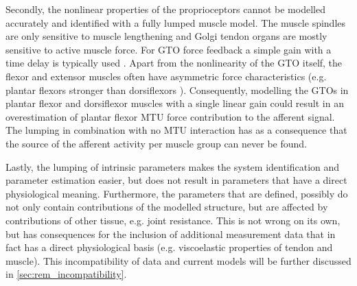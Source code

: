 Secondly, the nonlinear properties of the proprioceptors cannot be modelled accurately and identified with a fully lumped muscle model. The muscle spindles are only sensitive to muscle lengthening and Golgi tendon organs are mostly sensitive to active muscle force. For GTO force feedback a simple gain with a time delay is typically used \cite{schouten_nmclab_2008, mugge_rigorous_2010}. Apart from the nonlinearity of the GTO itself, the flexor and extensor muscles often have asymmetric force characteristics (e.g. plantar flexors stronger than dorsiflexors \cite{fukunaga_specific_1996}). Consequently, modelling the GTOs in plantar flexor and dorsiflexor muscles with a single linear gain could result in an overestimation of plantar flexor MTU force contribution to the afferent signal. The lumping in combination with no MTU interaction has as a consequence that the source of the afferent activity per muscle group can never be found. 

Lastly, the lumping of intrinsic parameters makes the system identification and parameter estimation easier, but does not result in parameters that have a direct physiological meaning. Furthermore, the parameters that are defined, possibly do not only contain contributions of the modelled structure, but are affected by contributions of other tissue, e.g. joint resistance. This is not wrong on its own, but has consequences for the inclusion of additional measurement data that in fact has a direct physiological basis (e.g. viscoelastic properties of tendon and muscle). This incompatibility of data and current models will be further discussed in \autoref{sec:rem_incompatibility}. 

\begin{landscape}



\end{landscape}
